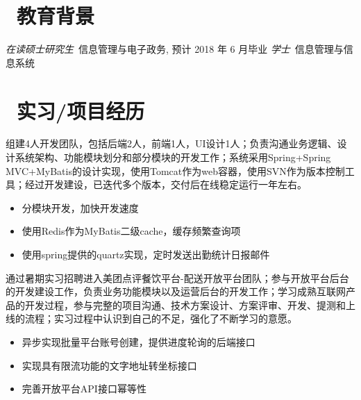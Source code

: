 \documentclass{resume}
\begin{document}


 
\section{\faGraduationCap\  教育背景}
\textit{在读硕士研究生}\ 信息管理与电子政务, 预计 2018 年 6 月毕业
\textit{学士}\ 信息管理与信息系统

\section{\faUsers\ 实习/项目经历}

\begin{onehalfspacing}
组建4人开发团队，包括后端2人，前端1人，UI设计1人；负责沟通业务逻辑、设计系统架构、功能模块划分和部分模块的开发工作；系统采用Spring+Spring MVC+MyBatis的设计实现，使用Tomcat作为web容器，使用SVN作为版本控制工具；经过开发建设，已迭代多个版本，交付后在线稳定运行一年左右。
\begin{itemize}
  \item 分模块开发，加快开发速度
  \item 使用Redis作为MyBatis二级cache，缓存频繁查询项
  \item 使用spring提供的quartz实现，定时发送出勤统计日报邮件
\end{itemize}
\end{onehalfspacing}

通过暑期实习招聘进入美团点评餐饮平台-配送开放平台团队；参与开放平台后台的开发建设工作，负责业务功能模块以及运营后台的开发工作；学习成熟互联网产品的开发过程，参与完整的项目沟通、技术方案设计、方案评审、开发、提测和上线的流程；实习过程中认识到自己的不足，强化了不断学习的意愿。
\begin{itemize}
  \item 异步实现批量平台账号创建，提供进度轮询的后端接口
  \item 实现具有限流功能的文字地址转坐标接口
  \item 完善开放平台API接口幂等性
\end{itemize}
\end{document}
